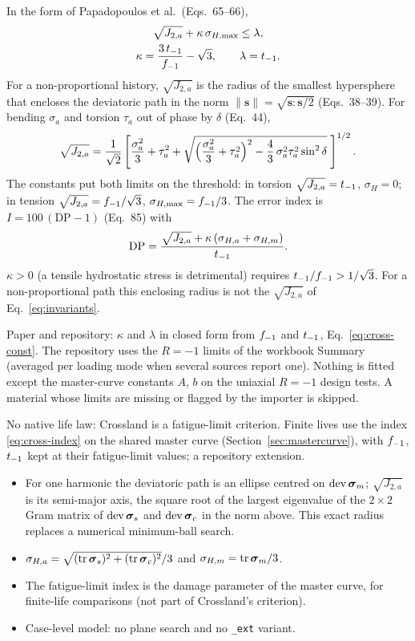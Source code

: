  In the form of Papadopoulos et al.\ (Eqs.~65--66),
\begin{gather}
\sqrt{J_{2,a}} + \kappa\,\sigma_{H,\max} \le \lambda , \label{eq:cross-main}\\
\kappa = \frac{3\,t_{-1}}{f_{-1}} - \sqrt3 , \qquad \lambda = t_{-1} . \label{eq:cross-const}
\end{gather}
For a non-proportional history, $\sqrt{J_{2,a}}$ is the radius of the smallest hypersphere that
encloses the deviatoric path in the norm $\lVert\mathbf s\rVert=\sqrt{\mathbf s:\mathbf s/2}$
(Eqs.~38--39). For bending $\sigma_a$ and torsion $\tau_a$ out of phase by $\delta$ (Eq.~44),
\begin{equation}
\sqrt{J_{2,a}} = \frac{1}{\sqrt2}\left[\frac{\sigma_a^2}{3} + \tau_a^2 +
\sqrt{\Bigl(\frac{\sigma_a^2}{3} + \tau_a^2\Bigr)^2 - \frac43\,\sigma_a^2\tau_a^2\sin^2\delta}\;\right]^{1/2} .
\label{eq:cross-j2}
\end{equation}
The constants put both limits on the threshold: in torsion $\sqrt{J_{2,a}}=t_{-1}$, $\sigma_H=0$; in
tension $\sqrt{J_{2,a}}=f_{-1}/\sqrt3$, $\sigma_{H,\max}=f_{-1}/3$. The error index is
$I=100\,(\mathrm{DP}-1)$ (Eq.~85) with
\begin{equation}
\mathrm{DP} = \frac{\sqrt{J_{2,a}} + \kappa\,(\sigma_{H,a}+\sigma_{H,m})}{t_{-1}} .
\label{eq:cross-index}
\end{equation}
$\kappa>0$ (a tensile hydrostatic stress is detrimental) requires $t_{-1}/f_{-1}>1/\sqrt3$. For a
non-proportional path this enclosing radius is not the $\sqrt{J_{2,a}}$ of
Eq.~\eqref{eq:invariants}.

 Paper and repository: $\kappa$ and $\lambda$ in closed form from
$f_{-1}$ and $t_{-1}$, Eq.~\eqref{eq:cross-const}. The repository uses the $R=-1$ limits of the workbook
Summary (averaged per loading mode when several sources report one). Nothing is fitted except the
master-curve constants $A$, $b$ on the uniaxial $R=-1$ design tests. A material whose limits are
missing or flagged by the importer is skipped.

 No native life law: Crossland is a fatigue-limit criterion. Finite lives use the index
\eqref{eq:cross-index} on the shared master curve (Section~\ref{sec:mastercurve}), with $f_{-1}$, $t_{-1}$
kept at their fatigue-limit values; a repository extension.

\begin{itemize}
\item For one harmonic the deviatoric path is an ellipse centred on $\operatorname{dev}\boldsymbol\sigma_m$; $\sqrt{J_{2,a}}$ is its
  semi-major axis, the square root of the largest eigenvalue of the $2\times2$ Gram matrix of
  $\operatorname{dev}\boldsymbol\sigma_s$ and $\operatorname{dev}\boldsymbol\sigma_c$ in the norm above. This exact radius replaces a numerical minimum-ball search.
\item $\sigma_{H,a}=\sqrt{(\operatorname{tr}\boldsymbol\sigma_s)^2+(\operatorname{tr}\boldsymbol\sigma_c)^2}/3$ and $\sigma_{H,m}=\operatorname{tr}\boldsymbol\sigma_m/3$.
\item The fatigue-limit index is the damage parameter of the master curve, for finite-life comparisons
  (not part of Crossland's criterion).
\item Case-level model: no plane search and no \texttt{\_ext} variant.
\end{itemize}

